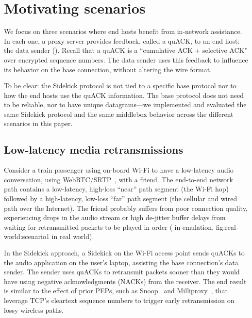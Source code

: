 \section{Motivating scenarios}
\label{sec:sidekick:motivating}



We focus on three scenarios where end hosts benefit from in-network assistance.
In each one, a proxy server provides feedback, called a quACK, to an end host:
the data sender (). Recall that a quACK is a
``cumulative ACK + selective ACK'' over encrypted sequence numbers. The data
sender uses this feedback to influence its behavior on the base connection,
without altering the wire format.

To be clear: the Sidekick protocol is not tied to a specific base protocol
nor to how the end hosts use the quACK information. The base protocol does not
need to be reliable, nor to have unique datagrams---we implemented and evaluated
the same Sidekick protocol and the same middlebox behavior across the different
scenarios in this paper.

\subsection{Low-latency media retransmissions}
\label{sec:sidekick:motivating:media}

Consider a train passenger using on-board Wi-Fi to have a low-latency audio
conversation, using WebRTC/SRTP~\cite{rfc8834webrtc}, with a friend. The
end-to-end network path contains a low-latency, high-loss ``near'' path
segment (the Wi-Fi hop) followed by a high-latency, low-loss ``far'' path
segment (the cellular and wired path over the Internet). The friend probably
suffers from poor connection quality, experiencing drops in the audio stream or
high de-jitter buffer delays from waiting for retransmitted packets to be
played in order ( in emulation, \Cref
{fig:real-world:scenario1} in real world).

In the Sidekick approach, a Sidekick on the Wi-Fi access point sends quACKs to the audio
application on the user's laptop, assisting the base connection's data sender.
The sender uses quACKs to retransmit packets sooner than they would have using
negative acknowledgments (NACKs) from the receiver. The end result is similar
to the effect of prior PEPs, such as Snoop~\cite{balakrishnan1995snoop} and
Milliproxy~\cite{polese2017milliproxy}, that leverage TCP's cleartext sequence
numbers to trigger early retransmission on lossy wireless paths.

